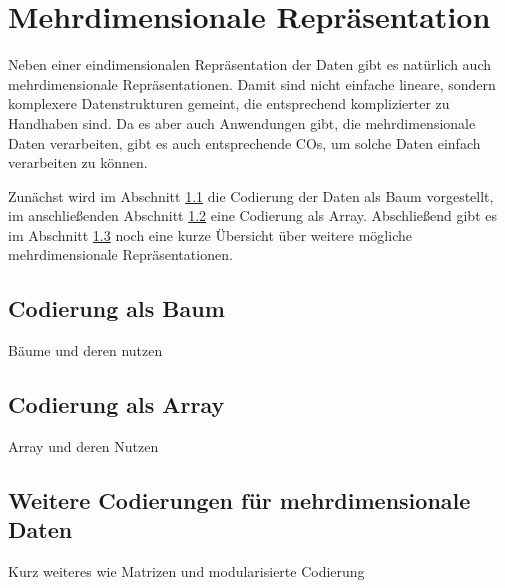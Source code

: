 
\section{Mehrdimensionale Repräsentation}
\label{sec:MehrdimRep}

Neben einer eindimensionalen Repräsentation der Daten gibt es natürlich auch mehrdimensionale Repräsentationen. Damit sind nicht einfache lineare, sondern komplexere Datenstrukturen gemeint, die entsprechend komplizierter zu Handhaben sind. Da es aber auch Anwendungen gibt, die mehrdimensionale Daten verarbeiten, gibt es auch entsprechende COs, um solche Daten einfach verarbeiten zu können.

Zunächst wird im Abschnitt \ref{sec:BaumCod} die Codierung der Daten als Baum vorgestellt, im anschließenden Abschnitt \ref{sec:ArrayCod} eine Codierung als Array. Abschließend gibt es im Abschnitt \ref{sec:WeitereMehrdim} noch eine kurze Übersicht über weitere mögliche mehrdimensionale Repräsentationen.

\subsection{Codierung als Baum}
\label{sec:BaumCod}

	Bäume und deren nutzen

\subsection{Codierung als Array}
\label{sec:ArrayCod}

	Array und deren Nutzen

\subsection{Weitere Codierungen für mehrdimensionale Daten}
\label{sec:WeitereMehrdim}

	Kurz weiteres wie Matrizen und modularisierte Codierung
